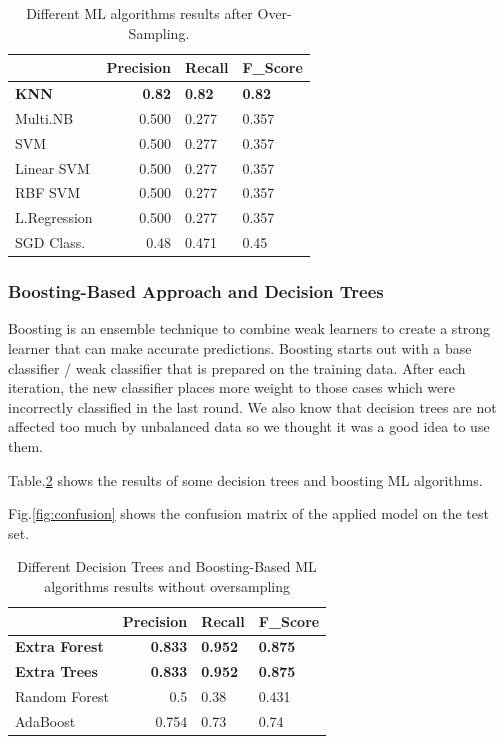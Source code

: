 \documentclass[11pt]{article}
\begin{document}
\begin{table}[htb]
\centering
\begin{tabular}{|l|r|l|l|} 
\cline{2-4}
\multicolumn{1}{l|}{}      & Precision & Recall & F\_Score   \\ 
\hline
\textbf{KNN} &	\textbf{0.82} &	\textbf{0.82} &	\textbf{0.82} \\ 
\hline
Multi.NB  &	0.500 &	0.277 &	0.357 \\ 
\hline
SVM &	0.500 &	0.277 &	0.357 \\ 
\hline
Linear SVM &	0.500 &	0.277 &	0.357\\
\hline
RBF SVM &	0.500 &	0.277 &	0.357 \\ 
\hline
L.Regression	 &0.500 &	0.277 &	0.357 \\ 
\hline
SGD Class. &	0.48 &	0.471 &	0.45 \\ 
\hline
\end{tabular}
 \caption{Different ML algorithms results after Over-Sampling.}
    \label{tab:Over-Sampling}
\end{table}

\subsubsection{Boosting-Based Approach and Decision Trees}

Boosting is an ensemble technique to combine weak learners to create a strong learner that can make accurate predictions. Boosting starts out with a base classifier / weak classifier that is prepared on the training data.
After each iteration, the new classifier places more weight to those cases which were incorrectly classified in the last round.
We also know that decision trees are not affected too much by unbalanced data so we thought it was a good idea to use them.

Table.\ref{tab:boosting} shows the results of some decision trees and boosting ML algorithms.

Fig.\ref{fig:confusion} shows the confusion matrix of the applied model on the test set.
\begin{table}[htb]
\centering
\begin{tabular}{|l|r|l|l|} 
\cline{2-4}
\multicolumn{1}{l|}{}      & Precision & Recall & F\_Score   \\ 
\hline
\textbf{Extra Forest} &	\textbf{0.833} &	\textbf{0.952} &	\textbf{0.875}	 \\ 
\hline
\textbf{Extra Trees}  &	\textbf{0.833} &	\textbf{0.952} &	\textbf{0.875} \\ 
\hline
Random Forest &	0.5 &	0.38 &	0.431 \\ 
\hline
AdaBoost &	0.754 &	0.73 &	0.74\\
\hline

\end{tabular}
 \caption{Different Decision Trees and Boosting-Based ML algorithms results without oversampling}
    \label{tab:boosting}
\end{table}
\vspace{-4mm}
\end{document}
